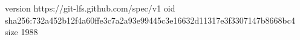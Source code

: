 version https://git-lfs.github.com/spec/v1
oid sha256:732a452b12f4a60ffe3c7a2a93e99445c3e16632d11317e3f3307147b8668bc4
size 1988
